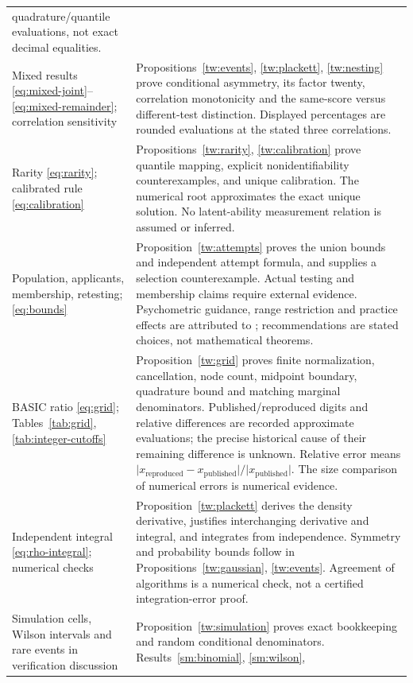\begin{longtable}{>{\raggedright\arraybackslash}p{.28\linewidth}>{\raggedright\arraybackslash}p{.65\linewidth}}
quadrature/quantile evaluations, not exact decimal equalities.\\
Mixed results \eqref{eq:mixed-joint}--\eqref{eq:mixed-remainder};
correlation sensitivity
& Propositions~\ref{tw:events}, \ref{tw:plackett}, \ref{tw:nesting} prove
conditional asymmetry, its factor twenty, correlation monotonicity and the
same-score versus different-test distinction. Displayed percentages are
rounded evaluations at the stated three correlations.\\
Rarity \eqref{eq:rarity}; calibrated rule \eqref{eq:calibration}
& Propositions~\ref{tw:rarity}, \ref{tw:calibration} prove quantile mapping,
explicit nonidentifiability counterexamples, and unique calibration. The
numerical root approximates the exact unique solution. No latent-ability
measurement relation is assumed or inferred.\\
Population, applicants, membership, retesting; \eqref{eq:bounds}
& Proposition~\ref{tw:attempts} proves the union bounds and independent
attempt formula, and supplies a selection counterexample. Actual testing
and membership claims require external evidence. Psychometric guidance,
range restriction and practice effects are attributed to
\citet{standards2014,sackett2000,hausknecht2007}; recommendations are stated
choices, not mathematical theorems.\\
BASIC ratio \eqref{eq:grid}; Tables~\ref{tab:grid}, \ref{tab:integer-cutoffs}
& Proposition~\ref{tw:grid} proves finite normalization, cancellation,
node count, midpoint boundary, quadrature bound and matching marginal
denominators. Published/reproduced digits and relative differences are
recorded approximate evaluations; the precise historical cause of their
remaining difference is unknown. Relative error means
\(\lvert x_{\mathrm{reproduced}}-x_{\mathrm{published}}\rvert/\lvert x_{\mathrm{published}}\rvert\).
The size comparison of numerical errors is numerical evidence.\\
Independent integral \eqref{eq:rho-integral}; numerical checks
& Proposition~\ref{tw:plackett} derives the density derivative, justifies
interchanging derivative and integral, and integrates from independence.
Symmetry and probability bounds follow in Propositions~\ref{tw:gaussian},
\ref{tw:events}. Agreement of algorithms is a numerical check, not a
certified integration-error proof.\\
Simulation cells, Wilson intervals and rare events in verification discussion
& Proposition~\ref{tw:simulation} proves exact bookkeeping and random
conditional denominators. Results~\ref{sm:binomial}, \ref{sm:wilson},

\end{longtable}
